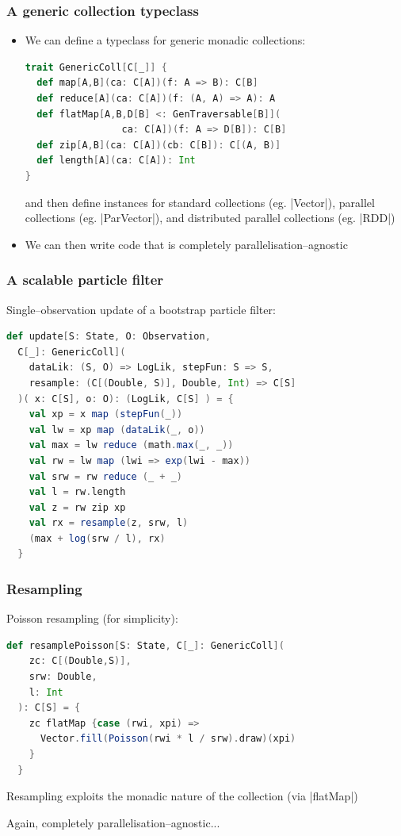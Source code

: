 \documentclass[mathserif,handout]{beamer}
\begin{document}
\begin{frame}[fragile]
  \frametitle{A generic collection typeclass}
  \begin{itemize}
  \item We can define a typeclass for generic monadic collections:
\begin{lstlisting}[language=scala]
trait GenericColl[C[_]] {
  def map[A,B](ca: C[A])(f: A => B): C[B]
  def reduce[A](ca: C[A])(f: (A, A) => A): A
  def flatMap[A,B,D[B] <: GenTraversable[B]](
                 ca: C[A])(f: A => D[B]): C[B]
  def zip[A,B](ca: C[A])(cb: C[B]): C[(A, B)]
  def length[A](ca: C[A]): Int
}
\end{lstlisting}
and then define instances for standard collections (eg. |Vector|), parallel collections (eg. |ParVector|), and distributed parallel collections (eg. |RDD|)
\item We can then write code that is completely \alert{parallelisation--agnostic}
  \end{itemize}
\end{frame}

\begin{frame}[fragile]
  \frametitle{A scalable particle filter}
Single--observation update of a bootstrap particle filter:
\begin{lstlisting}[language=scala]
def update[S: State, O: Observation,
  C[_]: GenericColl](
    dataLik: (S, O) => LogLik, stepFun: S => S,
    resample: (C[(Double, S)], Double, Int) => C[S]
  )( x: C[S], o: O): (LogLik, C[S] ) = {
    val xp = x map (stepFun(_))
    val lw = xp map (dataLik(_, o))
    val max = lw reduce (math.max(_, _))
    val rw = lw map (lwi => exp(lwi - max))
    val srw = rw reduce (_ + _)
    val l = rw.length
    val z = rw zip xp
    val rx = resample(z, srw, l)
    (max + log(srw / l), rx)
  }
\end{lstlisting}
\end{frame}

\begin{frame}[fragile]
\frametitle{Resampling}
Poisson resampling (for simplicity):
\begin{lstlisting}[language=scala]
def resamplePoisson[S: State, C[_]: GenericColl](
    zc: C[(Double,S)],
    srw: Double,
    l: Int
  ): C[S] = {
    zc flatMap {case (rwi, xpi) =>
      Vector.fill(Poisson(rwi * l / srw).draw)(xpi)
    }
  }
\end{lstlisting}
Resampling exploits the monadic nature of the collection (via |flatMap|)

Again, completely parallelisation--agnostic...
\end{frame}
\end{document}
